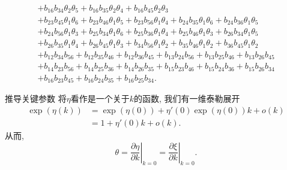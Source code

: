 \documentclass{beamer}
\newcommand{\eval}[2]{\left.{#1}\right|_{#2}}
\begin{document}
\begin{frame}
\[\begin{array}{l}
+b_{{16}}b_{{34}}\theta_{{2}}\theta_{{5}}
+b_{{16}}b_{{35}}\theta_{{2}}\theta_{{4}}
+b_{{16}}b_{{45}}\theta_{{2}}\theta_{{3}}\\
+b_{{23}}b_{{45}}\theta_{{1}}\theta_{{6}}
+b_{{23}}b_{{46}}\theta_{{1}}\theta_{{5}}
+b_{{23}}b_{{56}}\theta_{{1}}\theta_{{4}}
+b_{{24}}b_{{35}}\theta_{{1}}\theta_{{6}}
+b_{{24}}b_{{36}}\theta_{{1}}\theta_{{5}}\\
+b_{{24}}b_{{56}}\theta_{{1}}\theta_{{3}}
+b_{{25}}b_{{34}}\theta_{{1}}\theta_{{6}}
+b_{{25}}b_{{36}}\theta_{{1}}\theta_{{4}}
+b_{{25}}b_{{46}}\theta_{{1}}\theta_{{3}}
+b_{{26}}b_{{34}}\theta_{{1}}\theta_{{5}}\\
+b_{{26}}b_{{35}}\theta_{{1}}\theta_{{4}}
+b_{{26}}b_{{45}}\theta_{{1}}\theta_{{3}}
+b_{{34}}b_{{56}}\theta_{{1}}\theta_{{2}}
+b_{{35}}b_{{46}}\theta_{{1}}\theta_{{2}}
+b_{{36}}b_{{45}}\theta_{{1}}\theta_{{2}}\\
+b_{{12}}b_{{34}}b_{{56}}
+b_{{12}}b_{{35}}b_{{46}}
+b_{{12}}b_{{36}}b_{{45}}
+b_{{13}}b_{{24}}b_{{56}}
+b_{{13}}b_{{25}}b_{{46}}
+b_{{13}}b_{{26}}b_{{45}}\\
+b_{{14}}b_{{23}}b_{{56}}
+b_{{14}}b_{{25}}b_{{36}}
+b_{{14}}b_{{26}}b_{{35}}
+b_{{15}}b_{{23}}b_{{46}}
+b_{{15}}b_{{24}}b_{{36}}
+b_{{15}}b_{{26}}b_{{34}}\\
+b_{{16}}b_{{23}}b_{{45}}
+b_{{16}}b_{{24}}b_{{35}}
+b_{{16}}b_{{25}}b_{{34}} .
\end{array}
\]
\end{frame}

\begin{frame}{推导关键参数}
将$\eta$看作是一个关于$k$的函数, 我们有一维泰勒展开  
\begin{equation*}
\begin{split}
\exp(\eta(k))&=\exp(\eta(0))+\eta'(0)\exp(\eta(0))k+o(k)\\ 
&=1+\eta'(0)k+o(k). 
\end{split}
\end{equation*}
从而, 
\begin{equation*}
\theta=\eval{\frac{\partial \eta}{\partial k}}{k=0}=\eval{\frac{\partial \xi}{\partial k}}{k=0}.
\end{equation*}
\end{frame}
\end{document}
